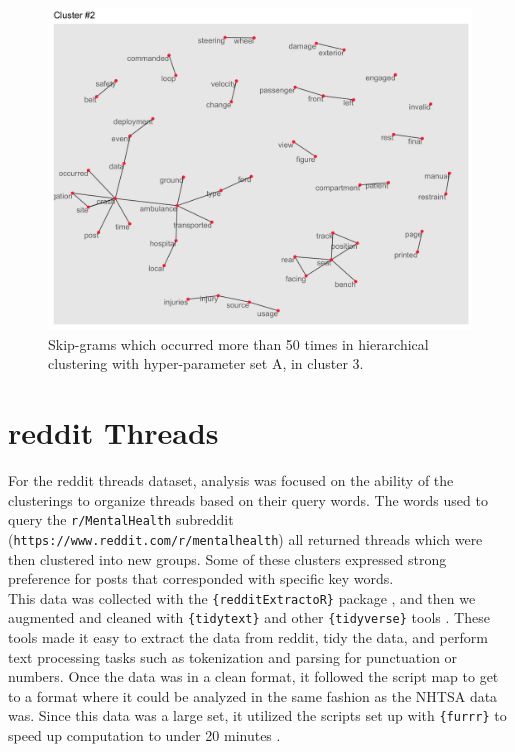 \begin{figure}
\includegraphics[width=6in]{Content/Images/graph_k5_2.png}
\caption{Skip-grams which occurred more than 50 times in hierarchical clustering with hyper-parameter set A, in cluster 3.}
\end{figure}


\section{reddit Threads}

\hspace*{0.3cm} For the reddit threads dataset, analysis was focused on the ability of the clusterings to organize threads based on their query words. The words used to query the \texttt{r/MentalHealth} subreddit (\texttt{https://www.reddit.com/r/mentalhealth}) all returned threads which were then clustered into new groups. Some of these clusters expressed strong preference for posts that corresponded with specific key words. \\

This data was collected with the \texttt{\{redditExtractoR\}} package \cite{rivera2015package}, and then we augmented and cleaned with \texttt{\{tidytext\}} \cite{silge2016tidytext} and other \texttt{\{tidyverse\}} tools \cite{wickham2019welcome}. These tools made it easy to extract the data from reddit, tidy the data, and perform text processing tasks such as tokenization and parsing for punctuation or numbers. Once the data was in a clean format, it followed the script map to get to a format where it could be analyzed in the same fashion as the NHTSA data was. Since this data was a large set, it utilized the scripts set up with \texttt{\{furrr\}} to speed up computation to under 20 minutes \cite{bengtsson2020unifying}.\\

